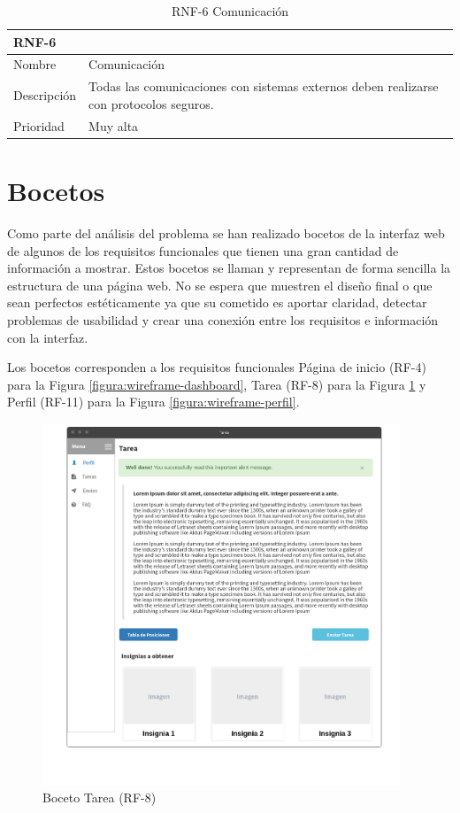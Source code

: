\documentclass[11pt,spanish,listoffigures,listoftables]{tfgetsinf}
\begin{document}
\begin{table}[ht!]
	\centering
	\begin{tabular}{ |p{4cm}||p{10cm}|  }
		\multicolumn{2}{l}{\textbf{RNF-6}} \\
		\hline
		Nombre & Comunicación \\
		\hline
		Descripción  & Todas las comunicaciones con sistemas externos deben realizarse con protocolos seguros. \\
		\hline
		Prioridad &  Muy alta \\
		\hline
	\end{tabular}
	\caption{RNF-6 Comunicación}
	\label{table:26}
\end{table}

\section{Bocetos}

Como parte del análisis del problema se han realizado bocetos de la interfaz web de algunos de los requisitos funcionales que tienen una gran cantidad de información a mostrar. Estos bocetos se llaman  y representan de forma sencilla la estructura de una página web. No se espera que muestren el diseño final o que sean perfectos estéticamente ya que su cometido es aportar claridad, detectar problemas de usabilidad y crear una conexión entre los requisitos e información con la interfaz.

Los bocetos corresponden a los requisitos funcionales Página de inicio (RF-4) para la Figura \ref{figura:wireframe-dashboard}, Tarea (RF-8) para la Figura \ref{figura:wireframe-tarea} y Perfil (RF-11) para la Figura \ref{figura:wireframe-perfil}.

\begin{figure}[!ht]
	\centering
	\includegraphics[width=0.95\textwidth]{img/wireframe-tarea}
	\caption[Boceto Tarea]{Boceto Tarea (RF-8)}
	\label{figura:wireframe-tarea}
\end{figure}
\end{document}
